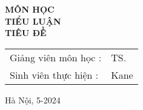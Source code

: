 \begin{titlepage}
\begin{center}
\fontsize{25pt}{0pt}\selectfont \textbf{MÔN HỌC} \\ \vspace{0.7cm}
\fontsize{18pt}{0pt}\selectfont \textbf{TIỂU LUẬN} \\ \vspace{10pt}
\fontsize{18pt}{0pt}\selectfont \textbf{TIÊU ĐỀ} \\ \vspace{2cm}


\begin{table}[H]
    \centering
    \begin{tabular}{l l}
        \fontsize{14pt}{0pt}\selectfont Giảng viên môn học \hspace{0.68cm}: & \fontsize{14pt}{0pt}\selectfont TS. \\
    
        \fontsize{14pt}{0pt}\selectfont Sinh viên thực hiện \hspace{0.748cm} :  & \fontsize{14pt}{0pt}\selectfont Kane \\
    \end{tabular}
\end{table}


\vspace{0.75cm} \fontsize{14pt}{0pt}\selectfont Hà Nội, 5-2024

\end{center}

\end{titlepage}


